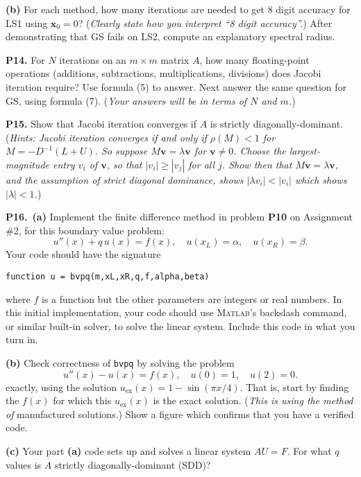\documentclass[12pt]{amsart}
\newcommand{\bv}{\mathbf{v}}
\newcommand{\bx}{\mathbf{x}}
\newcommand{\prob}[1]{\bigskip\noindent\textbf{#1.}\quad }
\newcommand{\epart}[1]{\medskip\noindent\textbf{(#1)}\quad }
\newcommand{\ppart}[1]{\,\textbf{(#1)}\quad }
\newcommand{\Matlab}{\textsc{Matlab}\xspace}
\begin{document}
\epart{b}  For each method, how many iterations are needed to get 8 digit accuracy for LS1 using $\bx_0=0$?  (\emph{Clearly state how you interpret ``8 digit accuracy''.})  After demonstrating that GS fails on LS2, compute an explanatory spectral radius.


\prob{P14}  For $N$ iterations on an $m\times m$ matrix $A$, how many floating-point operations (additions, subtractions, multiplications, divisions) does Jacobi iteration require?  Use formula (5) to answer.  Next answer the same question for GS, using formula (7).  (\emph{Your answers will be in terms of $N$ and $m$.})


\clearpage\newpage
\prob{P15}  Show that Jacobi iteration converges if $A$ is strictly diagonally-dominant.  (\emph{Hints:  Jacobi iteration converges if and only if $\rho(M) < 1$ for $M = - D^{-1}(L+U)$.  So suppose $M\bv = \lambda \bv$ for $\bv\ne 0$.  Choose the largest-magnitude entry $v_i$ of $\bv$, so that $|v_i| \ge |v_j|$ for all $j$.  Show then that $M\bv=\lambda\bv$, and the assumption of strict diagonal dominance, shows $|\lambda v_i| < |v_i|$ which shows $|\lambda|<1$.})


\prob{P16}  \ppart{a}  Implement the finite difference method in problem \textbf{P10} on Assignment \#2, for this boundary value problem:
\begin{equation*}
u''(x) + q\, u(x) = f(x), \quad u(x_L) = \alpha, \quad u(x_R) = \beta. \end{equation*}
Your code should have the signature

\centerline{\texttt{function u = bvpq(m,xL,xR,q,f,alpha,beta)}}

\noindent where $f$ is a function but the other parameters are integers or real numbers.  In this initial implementation, your code should use \Matlab's backslash command, or similar built-in solver, to solve the linear system.  Include this code in what you turn in.

\epart{b}  Check correctness of \texttt{bvpq} by solving the problem
\begin{equation*}
u''(x) - u(x) = f(x), \quad u(0) = 1, \quad u(2) = 0.
\end{equation*}
exactly, using the solution $u_{\text{ex}}(x)=1 - \sin(\pi x/4)$.  That is, start by finding the $f(x)$ for which this $u_{\text{ex}}(x)$ is the exact solution.  (\emph{This is using the method of} manufactured solutions.)  Show a figure which confirms that you have a verified code.

\epart{c}  Your part \textbf{(a)} code sets up and solves a linear system $AU=F$.  For what $q$ values is $A$ strictly diagonally-dominant (SDD)?
\end{document}
